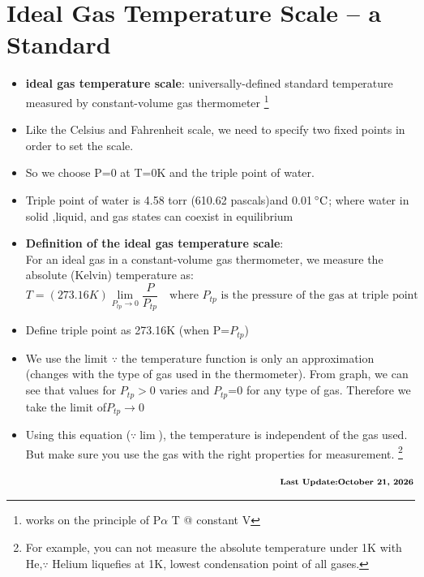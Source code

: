 \documentclass[12 pt , twoside, letterpaper] {article}
\begin{document}
\section{Ideal Gas Temperature Scale -- a Standard}
\begin{itemize}
\item \textbf{ideal gas temperature scale}: universally-defined standard temperature measured by constant-volume gas thermometer \footnote{works on the principle of P$\alpha$ T @ constant V}
\item Like the Celsius and Fahrenheit scale, we need to specify two fixed points in order to set the scale.
\item So we choose P=0 at T=0K and the triple point of water.
\item Triple point of water is 4.58 torr (610.62 pascals)and 0.01$\,^{\circ}{\rm C} $; where water in solid ,liquid, and gas states can coexist in equilibrium
\item \textbf{Definition of the ideal gas temperature scale}:\\For an ideal gas in a constant-volume gas thermometer, we measure the absolute (Kelvin) temperature as:
$$T= (273.16 K)\lim_{P_{tp} \rightarrow 0}\frac {P}{P_{tp}} \quad \text{where $P_{tp}$ is the pressure of the gas at triple point}$$
\item Define triple point as 273.16K (when P=$P_{tp}$)
\item We use the limit $\because$ the temperature function is only an approximation (changes with the type of gas used in the thermometer). From graph, we can see that values for $P_{tp}>$0 varies and $P_{tp}$=0 for any type of gas. Therefore we take the limit of$ P_{tp} \rightarrow$0
\item Using this equation ($\because \lim$), the temperature is independent of the gas used. But make sure you use the gas with the right properties for measurement. \footnote{For example, you can not measure the absolute temperature under 1K with He,$\because$ Helium liquefies at 1K, lowest condensation point of all gases.}
\end{itemize}

$\quad \quad \quad  \quad \quad \quad \quad \quad \quad \quad \quad \quad \quad \quad \quad \quad \quad \quad \quad \quad \quad \quad \quad \quad \quad \quad \quad \quad \quad \quad \quad \textbf{Last Update:\today}$
\end{document}
